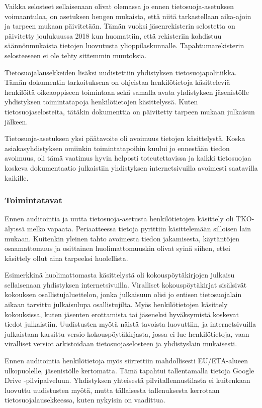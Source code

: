 \documentclass[finnish]{tktltiki}
\begin{document}
Vaikka selosteet sellaisenaan olivat olemassa jo ennen tietosuoja-asetuksen voimaantuloa, on asetuksen hengen mukaista, että niitä tarkastellaan aika-ajoin ja tarpeen mukaan päivitetään. Tämän vuoksi jäsenrekisterin selostetta on päivitetty joulukuussa 2018 kun huomattiin, että rekisteriin kohdistuu säännönmukaista tietojen luovutusta ylioppilaskunnalle. Tapahtumarekisterin selosteeseen ei ole tehty sittemmin muutoksia.

Tietosuojalausekkeiden lisäksi uudistettiin yhdistyksen tietosuojapolitiikka. Tämän dokumentin tarkoituksena on ohjeistaa henkilötietoja käsitteleviä henkilöitä oikeaoppiseen toimintaan sekä samalla avata yhdistyksen jäsenistölle yhdistyksen toimintatapoja henkilötietojen käsittelyssä. Kuten tietosuojaselosteita, tätäkin dokumenttia on päivitetty tarpeen mukaan julkaisun jälkeen.

Tietosuoja-asetuksen yksi päätavoite oli avoimuus tietojen käsittelystä. Koska asiakasyhdistyksen omiinkin toimintatapoihin kuului jo ennestään tiedon avoimuus, oli tämä vaatimus hyvin helposti toteutettavissa ja kaikki tietosuojaa koskeva dokumentaatio julkaistiin yhdistyksen internetsivuilla avoimesti saatavilla kaikille.

\subsubsection{Toimintatavat}

Ennen auditointia ja uutta tietosuoja-asetusta henkilötietojen käsittely oli TKO-äly:ssä melko vapaata. Periaatteessa tietoja pyrittiin käsittelemään silloisen lain mukaan. Kuitenkin yleinen tahto avoimesta tiedon jakamisesta, käytäntöjen osaamattomuus ja osittainen huolimattomuuskin olivat syinä siihen, ettei käsittely ollut aina tarpeeksi huolellista.

Esimerkkinä huolimattomasta käsittelystä oli kokouspöytäkirjojen julkaisu sellaisenaan yhdistyksen internetsivuilla. Viralliset kokouspöytäkirjat sisälsivät kokouksen osallistujaluettelon, jonka julkaisuun olisi jo entisen tietosuojalain aikaan tarvittu julkaisulupa osallistujilta. Myös henkilötietojen käsittely kokouksissa, kuten jäsenten erottamista tai jäseneksi hyväksymistä koskevat tiedot julkaistiin. Uudistusten myötä näistä tavoista luovuttiin, ja internetsivuilla julkaistaan karsittu versio kokouspöytäkirjasta, jossa ei lue henkilötietoja, vaan viralliset versiot arkistoidaan tietosuojaselosteen ja yhdistyslain mukaisesti.

Ennen auditointia henkilötietoja myös siirrettiin mahdollisesti EU/ETA-alueen ulkopuolelle, jäsenistölle kertomatta. Tämä tapahtui tallentamalla tietoja Google Drive -pilvipalveluun. Yhdistyksen yhteisestä pilvitallennustilasta ei kuitenkaan luovuttu uudistusten myötä, mutta tällaisesta tallenuksesta kerrotaan tietosuojalausekkeessa, kuten nykyisin on vaadittua.
\end{document}
